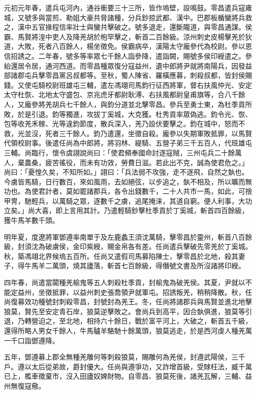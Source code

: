 \begin{pinyinscope}
元初元年春，遣兵屯河內，通谷衝要三十三所，皆作塢壁，設鳴鼓。零昌遣兵寇雍城，又號多與當煎、勒姐大豪共脅諸種，分兵鈔掠武都、漢中。巴郡板楯蠻將兵救之，漢中五官掾程信率壯士與蠻共擊破之。號多退走，還斷隴道，與零昌通謀。侯霸、馬賢將湟中吏人及降羌胡於枹罕擊之，斬首二百餘級。涼州刺史皮楊擊羌於狄道，大敗，死者八百餘人，楊坐徵免。侯霸病卒，漢陽太守龐參代為校尉。參以恩信招誘之。二年春，號多等率眾七千餘人詣參降，遣詣闕，賜號多侯印綬遣之。參紿還居令居，通河西道。而零昌種眾復分寇益州，遺中郎將尹就將南陽兵，因發益部諸郡屯兵擊零昌黨呂叔都等。至秋，蜀人陳省、羅橫應募，刺殺叔都，皆封侯賜錢。又使屯騎校尉班雄屯三輔，遣左馮翊司馬鈞行征西將軍，督右扶風仲光、安定太守杜恢、北地太守盛包、京兆虎牙都尉耿溥、右扶風都尉皇甫旗等，合八千餘人，又龐參將羌胡兵七千餘人，與鈞分道並北擊零昌。參兵至勇士東，為杜季貢所敗，於是引退。鈞等獨進，攻拔丁奚城，大克獲。杜秀貢率眾偽逃。鈞令光、恢、包等收羌禾稼、光等違鈞節度，散兵深入，羌乃設伏要擊之。鈞在城中，怒而不救，光並沒，死者三千餘人。鈞乃遣還，坐徵自殺。龐參以失期軍敗抵罪，以馬賢代領校尉事。後遣任尚為中郎將，將羽林、緹騎、五營子弟三千五百人，代班雄屯三輔。尚臨行，懷令虞詡說尚曰：「使君頻奉國命討逐寇賊，三州屯兵二十餘萬人，棄農桑，疲苦徭役，而未有功效，勞費日滋。若此出不克，誠為使君危之。」尚曰：「憂惶久矣，不知所如。」詡曰：「兵法弱不攻強，走不逐飛，自然之埶也。今虜皆馬騎，日行數百，來如風雨，去如絕弦，以步追之，埶不相及，所以曠而無功也。為使君計者，莫如罷諸郡兵，各令出錢數千，二十人共市一馬，如此，可捨甲冑，馳輕兵，以萬騎之眾，逐數千之虜，追尾掩涞，其道自窮。便人利事，大功立矣。」尚大喜，即上言用其計。乃遣輕騎鈔擊杜季貢於丁奚城，斬首四百餘級，獲牛馬羊數千頭。

明年夏，度遼將軍鄧遵率南單于及左鹿蠡王須沈萬騎，擊零昌於靈州，斬首八百餘級，封須沈為破虜侯，金印紫綬，賜金帛各有差。任尚遣兵擊破先零羌於丁奚城。秋，築馮翊北界候塢五百所。任尚又遣假司馬募陷陳士，擊零昌於北地，殺其妻子，得牛馬羊二萬頭，燒其廬落，斬首七百餘級，得僭號文書及所沒諸將印綬。

四年春，尚遣當闐種羌榆鬼等五人刺殺杜季貢，封榆鬼為破羌侯。其夏，尹就以不能定益州，坐徵抵罪，以益州刺史張喬領尹就軍屯。招誘叛羌，稍稍降散。秋，任尚復募效功種號封刺殺零昌，封號封為羌王。冬，任尚將諸郡兵與馬賢並進北地擊狼莫，賢先至安定青石岸，狼莫逆擊敗之。會尚兵到高平，因合埶俱進，狼莫等引退，乃轉營迫之，至北地，相持六十餘日，戰於富平河上，大破之，斬首五千級，還得所略人男女千餘人，牛馬驢羊駱馳十餘萬頭，狼莫逃走，於是西河虔人種羌萬一千口詣鄧遵降。

五年，鄧遵募上郡全無種羌雕何等刺殺狼莫，賜雕何為羌侯，封遵武陽侯，三千戶。遵以太后從弟故，爵封優大。任尚與遵爭功，又詐增首級，受賕枉法，臧千萬已上，檻車徵棄市，沒入田廬奴婢財物。自零昌、狼莫死後，諸羌瓦解，三輔、益州無復寇儆。


\end{pinyinscope}
